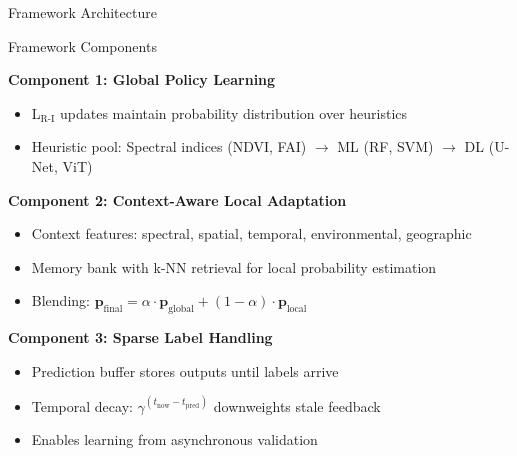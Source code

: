 \documentclass[10pt,xcolor={table,dvipsnames}]{beamer}
\begin{document}
\begin{frame}{Framework Architecture}

\end{frame}

\begin{frame}{Framework Components}

\textbf{Component 1: Global Policy Learning}
\begin{itemize}
  \item L$_{\text{R-I}}$ updates maintain probability distribution over heuristics
  \item Heuristic pool: Spectral indices (NDVI, FAI) $\rightarrow$ ML (RF, SVM) $\rightarrow$ DL (U-Net, ViT)
\end{itemize}

\vspace{0.3em}
\textbf{Component 2: Context-Aware Local Adaptation}
\begin{itemize}
  \item Context features: spectral, spatial, temporal, environmental, geographic
  \item Memory bank with k-NN retrieval for local probability estimation
  \item Blending: $\mathbf{p}_{\text{final}} = \alpha \cdot \mathbf{p}_{\text{global}} + (1-\alpha) \cdot \mathbf{p}_{\text{local}}$
\end{itemize}

\vspace{0.3em}
\textbf{Component 3: Sparse Label Handling}
\begin{itemize}
  \item Prediction buffer stores outputs until labels arrive
  \item Temporal decay: $\gamma^{(t_{\text{now}} - t_{\text{pred}})}$ downweights stale feedback
  \item Enables learning from asynchronous validation
\end{itemize}

\end{frame}
\end{document}
